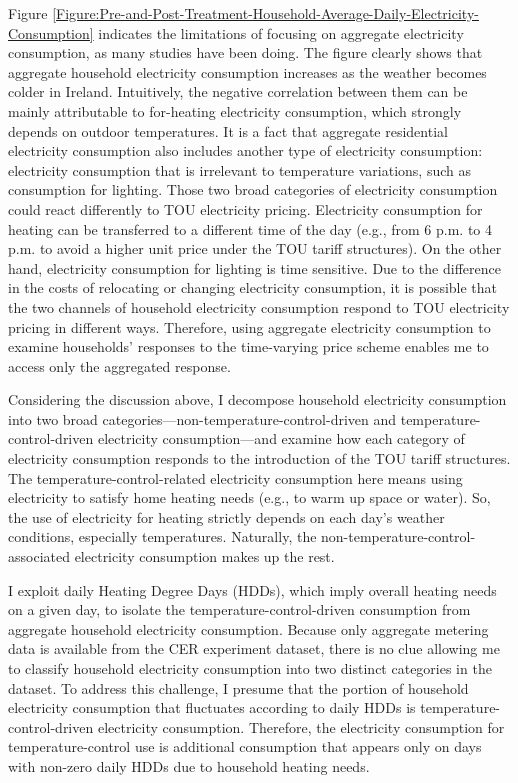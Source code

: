 Figure 
\ref{Figure:Pre-and-Post-Treatment-Household-Average-Daily-Electricity-Consumption} 
indicates the limitations of focusing on aggregate electricity consumption, as many studies have been doing. The figure clearly shows that aggregate household electricity consumption increases as the weather becomes colder in Ireland. Intuitively, the negative correlation between them can be mainly attributable to for-heating electricity consumption, which strongly depends on outdoor temperatures. It is a fact that aggregate residential electricity consumption also includes another type of electricity consumption: electricity consumption that is irrelevant to temperature variations, such as consumption for lighting. Those two broad categories of electricity consumption could react differently to TOU electricity pricing. Electricity consumption for heating can be transferred to a different time of the day (e.g., from 6 p.m. to 4 p.m. to avoid a higher unit price under the TOU tariff structures). On the other hand, electricity consumption for lighting is time sensitive. Due to the difference in the costs of relocating or changing electricity consumption, it is possible that the two channels of household electricity consumption respond to TOU electricity pricing in different ways. Therefore, using aggregate electricity consumption to examine households' responses to the time-varying price scheme enables me to access only the aggregated response. 

Considering the discussion above, I decompose household electricity consumption into two broad categories---non-temperature-control-driven and temperature-control-driven electricity consumption---and examine how each category of electricity consumption responds to the introduction of the TOU tariff structures. The temperature-control-related electricity consumption here means using electricity to satisfy home heating needs (e.g., to warm up space or water). So, the use of electricity for heating strictly depends on each day's weather conditions, especially temperatures. Naturally, the non-temperature-control-associated electricity consumption makes up the rest. 

I exploit daily Heating Degree Days (HDDs), which imply overall heating needs on a given day, to isolate the temperature-control-driven consumption from aggregate household electricity consumption. Because only aggregate metering data is available from the CER experiment dataset, there is no clue allowing me to classify household electricity consumption into two distinct categories in the dataset. To address this challenge, I presume that the portion of household electricity consumption that fluctuates according to daily HDDs is temperature-control-driven electricity consumption. Therefore, the electricity consumption for temperature-control use is additional consumption that appears only on days with non-zero daily HDDs due to household heating needs.

